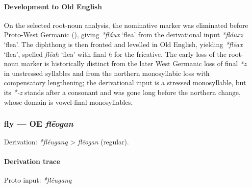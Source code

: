 \documentclass[
  british,
  a4paper,
]{article}
\providecommand{\Recon}[1]{\emph{*#1}}
\begin{document}
\paragraph{Development to Old
English}\label{development-to-old-english-19}

On the selected root-noun analysis, the nominative marker was eliminated
before Proto-West Germanic (), giving \Recon{fláux} `flea' from the derivational
input \Recon{fláuxz} `flea'. The diphthong is then fronted and levelled
in Old English, yielding \Recon{flēax} `flea', spelled \emph{flēah}
`flea' with final \emph{h} for the fricative. The early loss of the
root-noun marker is historically distinct from the later West Germanic
loss of final \emph{*z} in unstressed syllables and from the northern
monosyllabic loss with compensatory lengthening; the derivational input
is a stressed monosyllable, but its \emph{*-z} stands after a consonant
and was gone long before the northern change, whose domain is
vowel-final monosyllables.

\subsubsection{\texorpdfstring{fly --- OE
\emph{flēogan}}{fly --- OE flēogan}}\label{fly-oe-flux113ogan}

Derivation: \emph{*fléuganą} \textgreater{} \emph{flēogan} (regular).

\paragraph{Derivation trace}\label{derivation-trace-21}

Proto input: \emph{*fléuganą}

\begingroup
\setlength{\fboxsep}{6pt}
\end{document}
